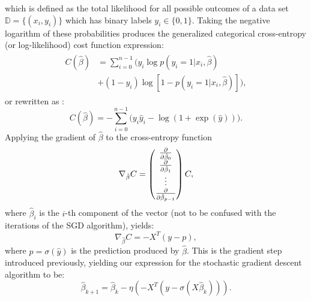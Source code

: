             which is defined as the total likelihood for all possible outcomes of a data set $\mathds{D}=\{ (x_i, y_i) \}$ which has binary labels $y_i \in \{ 0,1 \}$. Taking the negative logarithm of these probabilities produces the generalized categorical cross-entropy (or log-likelihood) cost function expression:
            \begin{align}
                \begin{split}
                    C(\hat{\beta}) &= \sum_{i=0}^{n-1} \bigg( y_i\log p(y_i=1|x_i, \hat{\beta}) \\&+ (1-y_i)\log\left[1-p(y_i=1|x_i, \hat{\beta})\right] \bigg),
                \end{split}
            \end{align}
            or rewritten as \cite{lecturenotes}:
            \begin{equation}
                C(\hat{\beta}) = -\sum^{n-1}_{i=0} \big( y_i \hat{y}_i - \log\left( 1 + \exp(\hat{y}) \right) \big).
            \end{equation}
            Applying the gradient of $\hat{\beta}$ to the cross-entropy function
            \begin{equation}
                \nabla_{\hat{\beta}}C =
                \begin{pmatrix}
                    \pdv{}{\hat{\beta}_0} \\
                    \pdv{}{\hat{\beta}_1} \\ 
                    \vdots \\ 
                    \pdv{}{\hat{\beta}_{p-1}} \\ 
                \end{pmatrix}C,
            \end{equation}
            where $\hat{\beta}_i$ is the $i$-th component of the vector (not to be confused with the iterations of the SGD algorithm), yields:
            \begin{equation}
                \nabla_{\hat{\beta}} C = -X^T\left( y - p \right),
            \end{equation}
            where $p=\sigma(\hat{y})$ is the prediction produced by $\hat{\beta}$. This is the gradient step introduced previously, yielding our expression for the stochastic gradient descent algorithm to be:
            \begin{equation}
                \hat{\beta}_{k+1} = \hat{\beta}_k - \eta \left( -X^T\left( y-\sigma(X\hat{\beta}_k) \right) \right).
            \end{equation}
